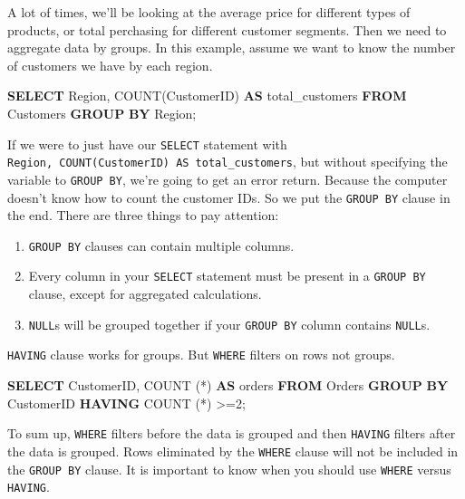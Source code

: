 \documentclass[]{book}
\newenvironment{Shaded}{\begin{snugshade}}{\end{snugshade}}
\newcommand{\KeywordTok}[1]{\textcolor[rgb]{0.13,0.29,0.53}{\textbf{{#1}}}}
\newcommand{\DecValTok}[1]{\textcolor[rgb]{0.00,0.00,0.81}{{#1}}}
\newcommand{\FunctionTok}[1]{\textcolor[rgb]{0.00,0.00,0.00}{{#1}}}
\newcommand{\NormalTok}[1]{{#1}}
\providecommand{\tightlist}{%
  \setlength{\itemsep}{0pt}\setlength{\parskip}{0pt}}
\theoremstyle{definition}
\theoremstyle{definition}
\theoremstyle{remark}
\begin{document}
A lot of times, we'll be looking at the average price for different
types of products, or total perchasing for different customer segments.
Then we need to aggregate data by groups. In this example, assume we
want to know the number of customers we have by each region.

\begin{Shaded}
\begin{Highlighting}[]
\KeywordTok{SELECT} \NormalTok{Region, }\FunctionTok{COUNT}\NormalTok{(CustomerID) }\KeywordTok{AS} \NormalTok{total_customers}
\KeywordTok{FROM} \NormalTok{Customers}
\KeywordTok{GROUP} \KeywordTok{BY} \NormalTok{Region;}
\end{Highlighting}
\end{Shaded}

If we were to just have our \texttt{SELECT} statement with
\texttt{Region,\ COUNT(CustomerID)\ AS\ total\_customers}, but without
specifying the variable to \texttt{GROUP\ BY}, we're going to get an
error return. Because the computer doesn't know how to count the
customer IDs. So we put the \texttt{GROUP\ BY} clause in the end. There
are three things to pay attention:

\begin{enumerate}
\def\labelenumi{\arabic{enumi}.}
\tightlist
\item
  \texttt{GROUP\ BY} clauses can contain multiple columns.
\item
  Every column in your \texttt{SELECT} statement must be present in a
  \texttt{GROUP\ BY} clause, except for aggregated calculations.
\item
  \texttt{NULL}s will be grouped together if your \texttt{GROUP\ BY}
  column contains \texttt{NULL}s.
\end{enumerate}

\texttt{HAVING} clause works for groups. But \texttt{WHERE} filters on
rows not groups.

\begin{Shaded}
\begin{Highlighting}[]
\KeywordTok{SELECT} \NormalTok{CustomerID, }\FunctionTok{COUNT} \NormalTok{(*) }\KeywordTok{AS} \NormalTok{orders}
\KeywordTok{FROM} \NormalTok{Orders}
\KeywordTok{GROUP} \KeywordTok{BY} \NormalTok{CustomerID}
\KeywordTok{HAVING} \FunctionTok{COUNT} \NormalTok{(*) >=}\DecValTok{2}\NormalTok{;}
\end{Highlighting}
\end{Shaded}

To sum up, \texttt{WHERE} filters before the data is grouped and then
\texttt{HAVING} filters after the data is grouped. Rows eliminated by
the \texttt{WHERE} clause will not be included in the \texttt{GROUP\ BY}
clause. It is important to know when you should use \texttt{WHERE}
versus \texttt{HAVING}.
\end{document}

